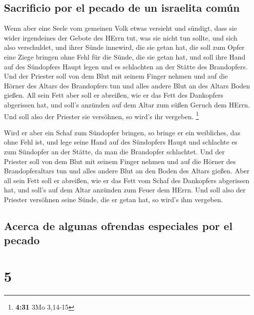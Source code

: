 \hypertarget{sacrificio-por-el-pecado-de-un-israelita-comuxfan}{%
\subsection{Sacrificio por el pecado de un israelita
común}\label{sacrificio-por-el-pecado-de-un-israelita-comuxfan}}

 Wenn aber eine Seele vom gemeinen Volk etwas versieht
und sündigt, dass sie wider irgendeines der Gebote des HErrn tut, was
sie nicht tun sollte, und sich also verschuldet,  und
ihrer Sünde innewird, die sie getan hat, die soll zum Opfer eine Ziege
bringen ohne Fehl für die Sünde, die sie getan hat,  und
soll ihre Hand auf des Sündopfers Haupt legen und es schlachten an der
Stätte des Brandopfers.  Und der Priester soll von dem
Blut mit seinem Finger nehmen und auf die Hörner des Altars des
Brandopfers tun und alles andere Blut an des Altars Boden gießen.
 All sein Fett aber soll er abreißen, wie er das Fett des
Dankopfers abgerissen hat, und soll's anzünden auf dem Altar zum süßen
Geruch dem HErrn. Und soll also der Priester sie versöhnen, so wird's
ihr vergeben. \footnote{\textbf{4:31} 3Mo 3,14-15}

 Wird er aber ein Schaf zum Sündopfer bringen, so bringe
er ein weibliches, das ohne Fehl ist,  und lege seine
Hand auf des Sündopfers Haupt und schlachte es zum Sündopfer an der
Stätte, da man die Brandopfer schlachtet.  Und der
Priester soll von dem Blut mit seinem Finger nehmen und auf die Hörner
des Brandopferaltars tun und alles andere Blut an den Boden des Altars
gießen.  Aber all sein Fett soll er abreißen, wie er das
Fett vom Schaf des Dankopfers abgerissen hat, und soll's auf dem Altar
anzünden zum Feuer dem HErrn. Und soll also der Priester versöhnen seine
Sünde, die er getan hat, so wird's ihm vergeben.

\hypertarget{acerca-de-algunas-ofrendas-especiales-por-el-pecado}{%
\subsection{Acerca de algunas ofrendas especiales por el
pecado}\label{acerca-de-algunas-ofrendas-especiales-por-el-pecado}}

\hypertarget{section-4}{%
\section{5}\label{section-4}}

